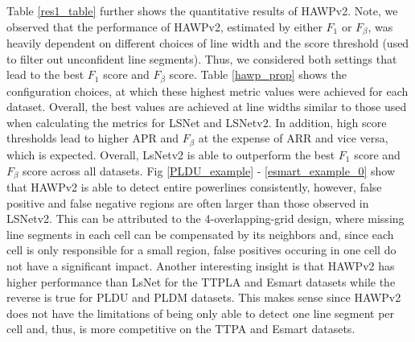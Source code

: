\documentclass[journal]{IEEEtran}
\begin{document}
Table \ref{res1_table} further shows the quantitative results of HAWPv2. Note, we observed that the performance of HAWPv2, estimated by either $F_1$ or $F_\beta$, was heavily dependent on different choices of line width and the score threshold (used to filter out unconfident line segments). Thus, we considered both settings that lead to the best $F_1$ score and $F_\beta$ score. Table \ref{hawp_prop} shows the configuration choices, at which these highest metric values were achieved for each dataset. Overall, the best values are achieved at line widths similar to those used when calculating the metrics for LSNet and LSNetv2. In addition, high score thresholds lead to higher APR and $F_\beta$ at the expense of ARR and vice versa, which is expected. Overall, LsNetv2 is able to outperform the best $F_1$ score and $F_\beta$ score across all datasets. Fig \ref{PLDU_example} - \ref{esmart_example_0} show that HAWPv2 is able to detect entire powerlines consistently, however, false positive and false negative regions are often larger than those observed in LSNetv2. This can be attributed to the 4-overlapping-grid design, where missing line segments in each cell can be compensated by its neighbors and, since each cell is only responsible for a small region, false positives occuring in one cell do not have a significant impact. Another interesting insight is that HAWPv2 has higher performance than LsNet for the TTPLA and Esmart datasets while the reverse is true for PLDU and PLDM datasets. This makes sense since HAWPv2 does not have the limitations of being only able to detect one line segment per cell and, thus, is more competitive on the TTPA and Esmart datasets.
\end{document}
